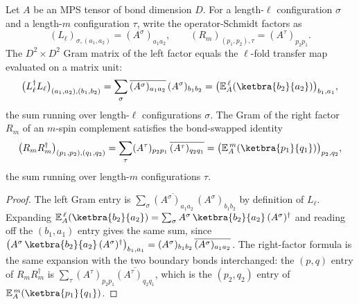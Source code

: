 \begin{lemma}
    \label{lem:schmidt_gram_transfer_power}
    \leanok
    Let $A$ be an MPS tensor of bond dimension $D$. For a length-$\ell$
    configuration $\sigma$ and a length-$m$ configuration $\tau$, write the
    operator-Schmidt factors as
    \[
        (L_\ell)_{\sigma,(a_1,a_2)} = (A^\sigma)_{a_1a_2},
        \qquad
        (R_m)_{(p_1,p_2),\tau} = (A^\tau)_{p_2p_1}.
    \]
    The $D^2\times D^2$ Gram matrix of the left factor equals the $\ell$-fold
    transfer map evaluated on a matrix unit:
    \[
        \bigl(L_\ell^\dagger L_\ell\bigr)_{(a_1,a_2),(b_1,b_2)}
            = \sum_{\sigma}\overline{(A^\sigma)_{a_1 a_2}}\,(A^\sigma)_{b_1 b_2}
            = \bigl(\mathbb{E}_A^{\,\ell}(\ketbra{b_2}{a_2})\bigr)_{b_1,a_1},
    \]
    the sum running over length-$\ell$ configurations $\sigma$. The Gram of the
    right factor $R_m$ of an $m$-spin complement satisfies the bond-swapped
    identity
    \[
        \bigl(R_m R_m^\dagger\bigr)_{(p_1,p_2),(q_1,q_2)}
            = \sum_{\tau}(A^\tau)_{p_2 p_1}\,
                \overline{(A^\tau)_{q_2 q_1}}
            = \bigl(\mathbb{E}_A^{\,m}(\ketbra{p_1}{q_1})\bigr)_{p_2,q_2},
    \]
    the sum running over length-$m$ configurations $\tau$.
\end{lemma}
\begin{proof}\leanok
    The left Gram entry is
    $\sum_\sigma \overline{(A^\sigma)_{a_1 a_2}}\,(A^\sigma)_{b_1 b_2}$
    by definition of $L_\ell$. Expanding
    $\mathbb{E}_A^{\,\ell}(\ketbra{b_2}{a_2})
        = \sum_\sigma A^\sigma\,\ketbra{b_2}{a_2}\,(A^\sigma)^\dagger$
    and reading off the $(b_1,a_1)$ entry gives the same sum, since
    $\bigl(A^\sigma\,\ketbra{b_2}{a_2}\,(A^\sigma)^\dagger\bigr)_{b_1,a_1}
        = (A^\sigma)_{b_1 b_2}\,\overline{(A^\sigma)_{a_1 a_2}}$.
    The right-factor formula is the same expansion with the two boundary bonds
    interchanged: the $(p,q)$ entry of $R_mR_m^\dagger$ is
    $\sum_\tau (A^\tau)_{p_2p_1}\overline{(A^\tau)_{q_2q_1}}$, which is the
    $(p_2,q_2)$ entry of
    $\mathbb{E}_A^{\,m}(\ketbra{p_1}{q_1})$.
\end{proof}

